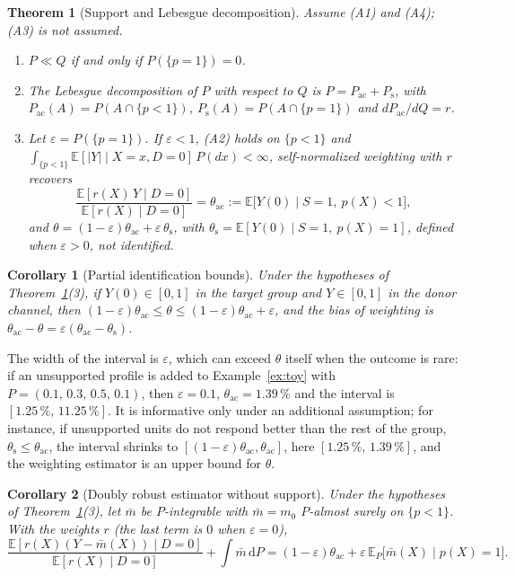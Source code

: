 \documentclass[twoside,11pt]{article}
\newcommand{\E}{\mathbb{E}}
\newcommand{\dd}{\,\mathrm{d}}
\newcommand{\Pac}{P_{\mathrm{ac}}}
\newcommand{\Ps}{P_{\mathrm{s}}}
\newcommand{\thac}{\theta_{\mathrm{ac}}}
\newcommand{\ths}{\theta_{\mathrm{s}}}
\theoremstyle{plain}
\newtheorem{theorem}{Theorem}
\newtheorem{corollary}{Corollary}
\theoremstyle{definition}
\begin{document}
\begin{theorem}[Support and Lebesgue decomposition]\label{thm:lebesgue}
Assume (A1) and (A4); (A3) is not assumed.
\begin{enumerate}
  \item $P\ll Q$ if and only if $P(\{p=1\})=0$.
  \item The Lebesgue decomposition of $P$ with respect to $Q$ is $P=\Pac+\Ps$, with $\Pac(A)=P(A\cap\{p<1\})$, $\Ps(A)=P(A\cap\{p=1\})$ and $d\Pac/dQ=r$.
  \item Let $\varepsilon=P(\{p=1\})$. If $\varepsilon<1$, (A2) holds on $\{p<1\}$ and $\int_{\{p<1\}}\E[|Y|\mid X=x,D=0]\,P(dx)<\infty$, self-normalized weighting with $r$ recovers
  \[
  \frac{\E[r(X)\,Y\mid D=0]}{\E[r(X)\mid D=0]}=\thac:=\E\bigl[Y(0)\mid S=1,\ p(X)<1\bigr],
  \]
  and $\theta=(1-\varepsilon)\thac+\varepsilon\,\ths$, with $\ths=\E[Y(0)\mid S=1,\ p(X)=1]$, defined when $\varepsilon>0$, not identified.
\end{enumerate}
\end{theorem}

\begin{corollary}[Partial identification bounds]\label{cor:bounds}
Under the hypotheses of Theorem~\ref{thm:lebesgue}(3), if $Y(0)\in[0,1]$ in the target group and $Y\in[0,1]$ in the donor channel, then $(1-\varepsilon)\thac\le\theta\le(1-\varepsilon)\thac+\varepsilon$, and the bias of weighting is $\thac-\theta=\varepsilon(\thac-\ths)$.
\end{corollary}
The width of the interval is $\varepsilon$, which can exceed $\theta$ itself when the outcome is rare: if an unsupported profile is added to Example~\ref{ex:toy} with $P=(0.1,\,0.3,\,0.5,\,0.1)$, then $\varepsilon=0.1$, $\thac=1.39\,\%$ and the interval is $[1.25\,\%,\,11.25\,\%]$. It is informative only under an additional assumption; for instance, if unsupported units do not respond better than the rest of the group, $\ths\le\thac$, the interval shrinks to $[(1-\varepsilon)\thac,\thac]$, here $[1.25\,\%,\,1.39\,\%]$, and the weighting estimator is an upper bound for $\theta$.

\begin{corollary}[Doubly robust estimator without support]\label{cor:drnosupport}
Under the hypotheses of Theorem~\ref{thm:lebesgue}(3), let $\bar m$ be $P$-integrable with $\bar m=m_0$ $P$-almost surely on $\{p<1\}$. With the weights $r$ (the last term is $0$ when $\varepsilon=0$),
\[
\frac{\E[r(X)(Y-\bar m(X))\mid D=0]}{\E[r(X)\mid D=0]}+\int\bar m\dd P=(1-\varepsilon)\thac+\varepsilon\,\E_P\bigl[\bar m(X)\mid p(X)=1\bigr].
\]
\end{corollary}
\end{document}
